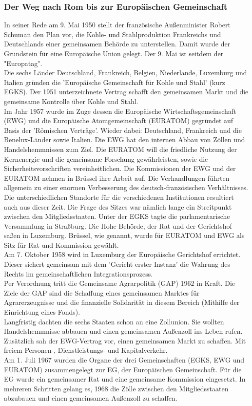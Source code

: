 \documentclass[letterpaper, 12pt]{article}
\let\tempsubsubsection\subsubsection
\renewcommand\subsubsection[1]{\vspace{0cm}\tempsubsubsection{#1}\vspace{0cm}}
\begin{document}
\subsubsection{Der Weg nach Rom bis zur Europäischen Gemeinschaft}

In seiner Rede am 9. Mai 1950 stellt der französische Außenminister Robert Schuman den Plan vor, die Kohle- und Stahlproduktion Frankreichs und Deutschlands einer gemeinsamen Behörde zu unterstellen. Damit wurde der Grundstein für eine Europäische Union gelegt. Der 9. Mai ist seitdem der "Europatag". \\
Die sechs Länder Deutschland, Frankreich, Belgien, Niederlande, Luxemburg und Italien gründen die 'Europäische Gemeinschaft für Kohle und Stahl' (kurz EGKS). Der 1951 unterzeichnete Vertrag schafft den gemeinsamen Markt und die gemeinsame Kontrolle über Kohle und Stahl. \\
Im Jahr 1957 wurde im Zuge dessen die Europäische Wirtschaftsgemeinschaft (EWG) und die Europäische Atomgemeinschaft (EURATOM) gegründet auf Basis der 'Römischen Verträge'. Wieder dabei: Deutschland, Frankreich und die Benelux-Länder sowie Italien. Die EWG hat den internen Abbau von Zöllen und Handelshemmnissen zum Ziel. Die EURATOM will die friedliche Nutzung der Kernenergie und die gemeinsame Forschung gewährleisten, sowie die Sicherheitsvorschriften vereinheitlichen. Die Kommissionen der EWG und der EURATOM nehmen in Brüssel ihre Arbeit auf. Die Verhandlungen führten allgemein zu einer enormen Verbesserung des deutsch-französischen Verhältnisses. \\
Die unterschiedlichen Standorte für die verschiedenen Institutionen resultiert auch aus dieser Zeit. Die Frage des Sitzes war nämlich lange ein Streitpunkt zwischen den Mitgliedsstaaten. Unter der EGKS tagte die parlamentarische Versammlung in Straßburg. Die Hohe Behörde, der Rat und der Gerichtshof saßen in Luxemburg. Brüssel, wie genannt, wurde für EURATOM und EWG als Sitz für Rat und Kommission gewählt. \\
Am 7. Oktober 1958 wird in Luxemburg der Europäische Gerichtshof errichtet. Dieser sichert gemeinsam mit dem 'Gericht erster Instanz' die Wahrung des Rechts im gemeinschaftlichen Integrationsprozess. \\
Per Verordnung tritt die Gemeinsame Agrarpolitik (GAP) 1962 in Kraft. Die Ziele der GAP sind die Schaffung eines gemeinsamen Marktes für Agrarerzeugnisse und die finanzielle Solidarität in diesem Bereich (Mithilfe der Einrichtung eines Fonds). \\
Langfristig dachten die sechs Staaten schon an eine Zollunion. Sie wollten Handelshemmnisse abbauen und einen gemeinsamen Außenzoll ins Leben rufen. Zusätzlich sah der EWG-Vertrag vor, einen gemeinsamen Markt zu schaffen. Mit freiem Personen-, Dienstleistungs- und Kapitalverkehr. \\
Am 1. Juli 1967 wurden die Organe der drei Gemeinschaften (EGKS, EWG und EURATOM) zusammengelegt zur EG, der Europäischen Gemeinschaft. Für die EG wurde ein gemeinsamer Rat und eine gemeinsame Kommission eingesetzt. In mehreren Schritten gelang es, 1968 die Zölle zwischen den Mitgliedsstaaten abzubauen und einen gemeinsamen Außenzoll zu schaffen.
\end{document}
